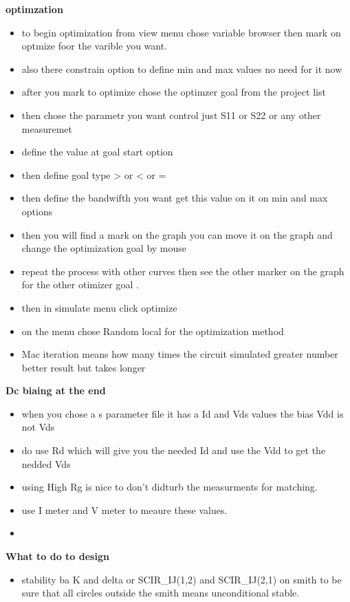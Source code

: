 \documentclass{article}
\begin{document}
\textbf{optimzation}
\begin{itemize}
    \item to begin optimization from  view menu chose variable browser then mark on optmize foor the varible you want.
    \item  also there constrain option to define min and max values no need for it now
    \item after you mark to optimize chose the optimzer goal from the project list 
    \item then chose the parametr you want control just S11 or S22  or any other measuremet 
    \item define the value at goal start option
    \item then define goal type > or < or = 
    \item then define the bandwifth you want get this value on it on min and max options 
    \item then you will find a mark on the graph you can move it on the graph and change the optimization goal  by mouse
    \item repeat the process with other curves then see the other marker on the graph for the other otimizer goal .
    \item then in simulate menu click optimize 
    \item on the menu chose Random local for the optimization method 
    \item Mac iteration means how many times the circuit simulated greater number better result but takes longer  

\end{itemize} 


\textbf{Dc biaing at the end}
\begin{itemize}
    \item when you chose a s parameter file it has a  Id and Vds values the bias Vdd is not Vds 
    \item do  use Rd which will give you the needed Id and use the Vdd to get the nedded Vds 
    \item using High Rg is nice to don't didturb the measurments for matching.
    \item use I meter and V meter to meaure these values.
    \item 
\end{itemize}






\textbf{What to do to design}
\begin{itemize}
    \item stability ba K and delta  or SCIR_IJ(1,2) and SCIR_IJ(2,1) on smith to be sure that all circles outside the smith means unconditional stable.
\end{itemize}
\end{document}
